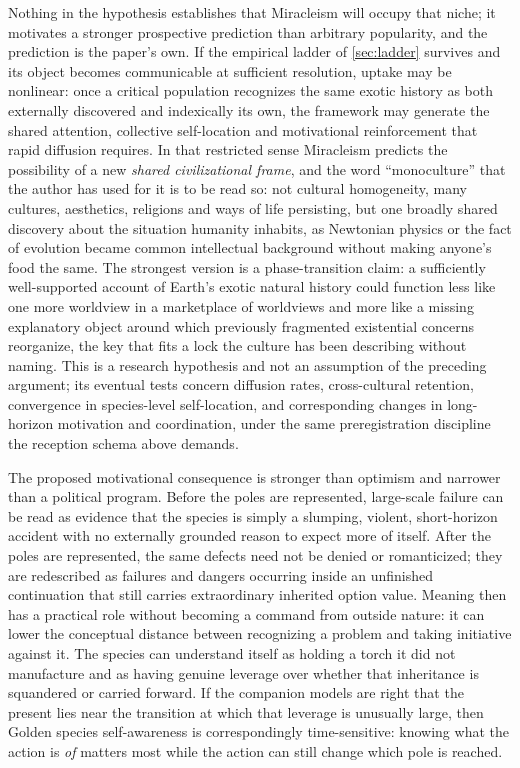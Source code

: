 Nothing in the hypothesis establishes that Miracleism will occupy that niche; it motivates a stronger prospective prediction than arbitrary popularity, and the prediction is the paper's own. If the empirical ladder of \autoref{sec:ladder} survives and its object becomes communicable at sufficient resolution, uptake may be nonlinear: once a critical population recognizes the same exotic history as both externally discovered and indexically its own, the framework may generate the shared attention, collective self-location and motivational reinforcement that rapid diffusion requires. In that restricted sense Miracleism predicts the possibility of a new \emph{shared civilizational frame}, and the word ``monoculture'' that the author has used for it is to be read so: not cultural homogeneity, many cultures, aesthetics, religions and ways of life persisting, but one broadly shared discovery about the situation humanity inhabits, as Newtonian physics or the fact of evolution became common intellectual background without making anyone's food the same. The strongest version is a phase-transition claim: a sufficiently well-supported account of Earth's exotic natural history could function less like one more worldview in a marketplace of worldviews and more like a missing explanatory object around which previously fragmented existential concerns reorganize, the key that fits a lock the culture has been describing without naming. This is a research hypothesis and not an assumption of the preceding argument; its eventual tests concern diffusion rates, cross-cultural retention, convergence in species-level self-location, and corresponding changes in long-horizon motivation and coordination, under the same preregistration discipline the reception schema above demands.

The proposed motivational consequence is stronger than optimism and
narrower than a political program. Before the poles are represented,
large-scale failure can be read as evidence that the species is simply a
slumping, violent, short-horizon accident with no externally grounded
reason to expect more of itself. After the poles are represented, the
same defects need not be denied or romanticized; they are redescribed as
failures and dangers occurring inside an unfinished continuation that
still carries extraordinary inherited option value. Meaning then has a
practical role without becoming a command from outside nature: it can
lower the conceptual distance between recognizing a problem and taking
initiative against it. The species can understand itself as holding a
torch it did not manufacture and as having genuine leverage over whether
that inheritance is squandered or carried forward. If the companion
models are right that the present lies near the transition at which that
leverage is unusually large, then Golden species self-awareness is correspondingly
time-sensitive: knowing what the action is \emph{of} matters most while
the action can still change which pole is reached.

